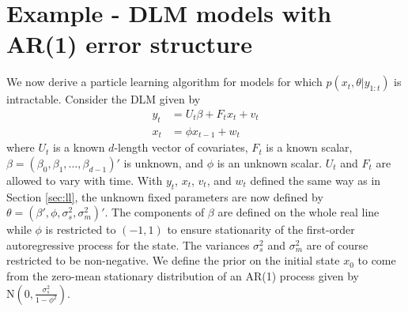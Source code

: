 \documentclass{article}
\begin{document}
\section{Example - DLM models with AR(1) error structure}

We now derive a particle learning algorithm for models for which $p(x_t,\theta|y_{1:t})$ is intractable. Consider the DLM given by
\begin{align}
y_t &= U_t\beta + F_tx_t + v_t \label{eqn:obs} \\
x_t &= \phi x_{t-1} + w_t \label{eqn:state}
\end{align}
where $U_t$ is a known $d$-length vector of covariates, $F_t$ is a known scalar, $\beta = (\beta_0,\beta_1,\ldots,\beta_{d-1})'$ is unknown, and $\phi$ is an unknown scalar. $U_t$ and $F_t$ are allowed to vary with time. With $y_t$, $x_t$, $v_t$, and $w_t$ defined the same way as in Section \ref{sec:ll}, the unknown fixed parameters are now defined by $\theta = (\beta',\phi,\sigma^2_s,\sigma^2_m)'$. The components of $\beta$ are defined on the whole real line while $\phi$ is restricted to $(-1,1)$ to ensure stationarity of the first-order autoregressive process for the state. The variances $\sigma^2_s$ and $\sigma^2_m$ are of course restricted to be non-negative. We define the prior on the initial state $x_0$ to come from the zero-mean stationary distribution of an AR(1) process given by $\mbox{N}(0,\frac{\sigma^2_s}{1-\phi^2})$.
\end{document}
